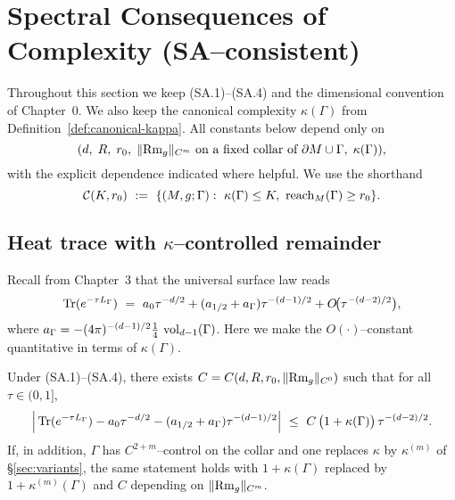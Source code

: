 \bigskip


\section{Spectral Consequences of Complexity (SA–consistent)}
\label{sec:spectral-complexity}

Throughout this section we keep (SA.1)–(SA.4) and the dimensional convention of Chapter~0. We also keep the canonical complexity $\kappa(\Gamma)$ from Definition~\ref{def:canonical-kappa}. All constants below depend only on
\[
(d,\;R,\;r_0,\;\|{\rm Rm}_g\|_{C^m}\ \text{on a fixed collar of }\partial M\cup\Gamma,\; \kappa(\Gamma)),
\]
with the explicit dependence indicated where helpful. We use the shorthand
\[
\mathcal{C}(K,r_0)\ :=\ \{(M,g;\Gamma):\ \kappa(\Gamma)\le K,\ \reach_M(\Gamma)\ge r_0\}.
\]

\subsection{Heat trace with $\kappa$–controlled remainder}
\label{subsec:heat-remainder-kappa}

Recall from Chapter~3 that the universal surface law reads
\[
\Tr(e^{-\tau L_\Gamma})\ =\ a_0\tau^{-d/2}+(a_{1/2}+a_\Gamma)\tau^{-(d-1)/2}+O\!\big(\tau^{-(d-2)/2}\big),
\]
where $a_\Gamma=-(4\pi)^{-(d-1)/2}\tfrac14\,\operatorname{vol}_{d-1}(\Gamma)$.
Here we make the $O(\cdot)$–constant quantitative in terms of $\kappa(\Gamma)$.

\begin{theorem}
\label{thm:heat-remainder-kappa}
Under (SA.1)–(SA.4), there exists $C=C(d,R,r_0,\|{\rm Rm}_g\|_{C^0})$ such that for all $\tau\in(0,1]$,
\[
\Big|\operatorname{Tr}(e^{-\tau L_\Gamma})-a_0\tau^{-d/2}-(a_{1/2}+a_\Gamma)\tau^{-(d-1)/2}\Big|
\ \le\ C\,\big(1+\kappa(\Gamma)\big)\,\tau^{-(d-2)/2}.
\]
If, in addition, $\Gamma$ has $C^{2+m}$–control on the collar and one replaces $\kappa$ by $\kappa^{(m)}$ of \S\ref{sec:variants}, the same statement holds with $1+\kappa(\Gamma)$ replaced by $1+\kappa^{(m)}(\Gamma)$ and $C$ depending on $\|{\rm Rm}_g\|_{C^m}$.
\end{theorem}

